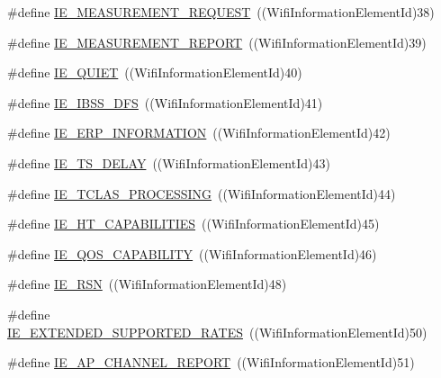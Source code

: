 \begin{DoxyCompactItemize}
\item 
\#define \hyperlink{wifi-information-element_8h_a40b4ae61f4cae226d9ad1960a69d860a}{I\+E\+\_\+\+M\+E\+A\+S\+U\+R\+E\+M\+E\+N\+T\+\_\+\+R\+E\+Q\+U\+E\+ST}~((Wifi\+Information\+Element\+Id)38)
\item 
\#define \hyperlink{wifi-information-element_8h_a955262b4760b3eb8315b3ac6ad5ca425}{I\+E\+\_\+\+M\+E\+A\+S\+U\+R\+E\+M\+E\+N\+T\+\_\+\+R\+E\+P\+O\+RT}~((Wifi\+Information\+Element\+Id)39)
\item 
\#define \hyperlink{wifi-information-element_8h_aaa4e0e3019b6cebf5ff972c2cc9663e9}{I\+E\+\_\+\+Q\+U\+I\+ET}~((Wifi\+Information\+Element\+Id)40)
\item 
\#define \hyperlink{wifi-information-element_8h_a69ac4bfda36599fe9a2eea7ce8e634f9}{I\+E\+\_\+\+I\+B\+S\+S\+\_\+\+D\+FS}~((Wifi\+Information\+Element\+Id)41)
\item 
\#define \hyperlink{wifi-information-element_8h_abbdde35d727b6d9880780926e8fc7276}{I\+E\+\_\+\+E\+R\+P\+\_\+\+I\+N\+F\+O\+R\+M\+A\+T\+I\+ON}~((Wifi\+Information\+Element\+Id)42)
\item 
\#define \hyperlink{wifi-information-element_8h_aeccfae0eb7a29d40b8e7a2983f2b96e5}{I\+E\+\_\+\+T\+S\+\_\+\+D\+E\+L\+AY}~((Wifi\+Information\+Element\+Id)43)
\item 
\#define \hyperlink{wifi-information-element_8h_aab3f4df5ff29bef2fade4a80755d370b}{I\+E\+\_\+\+T\+C\+L\+A\+S\+\_\+\+P\+R\+O\+C\+E\+S\+S\+I\+NG}~((Wifi\+Information\+Element\+Id)44)
\item 
\#define \hyperlink{wifi-information-element_8h_a084f884d4e68c709813c3c4c5e3c2eb7}{I\+E\+\_\+\+H\+T\+\_\+\+C\+A\+P\+A\+B\+I\+L\+I\+T\+I\+ES}~((Wifi\+Information\+Element\+Id)45)
\item 
\#define \hyperlink{wifi-information-element_8h_ae319bcce9491ddbbd42ee15f7541bdbe}{I\+E\+\_\+\+Q\+O\+S\+\_\+\+C\+A\+P\+A\+B\+I\+L\+I\+TY}~((Wifi\+Information\+Element\+Id)46)
\item 
\#define \hyperlink{wifi-information-element_8h_ac54df2e79a5887d5595e8d9f6b2956b6}{I\+E\+\_\+\+R\+SN}~((Wifi\+Information\+Element\+Id)48)
\item 
\#define \hyperlink{wifi-information-element_8h_aa84a6e717a87d52e889b3bc7ca7b5274}{I\+E\+\_\+\+E\+X\+T\+E\+N\+D\+E\+D\+\_\+\+S\+U\+P\+P\+O\+R\+T\+E\+D\+\_\+\+R\+A\+T\+ES}~((Wifi\+Information\+Element\+Id)50)
\item 
\#define \hyperlink{wifi-information-element_8h_aecc91e456c1544837f18c76ca4afa7b4}{I\+E\+\_\+\+A\+P\+\_\+\+C\+H\+A\+N\+N\+E\+L\+\_\+\+R\+E\+P\+O\+RT}~((Wifi\+Information\+Element\+Id)51)

\end{DoxyCompactItemize}
